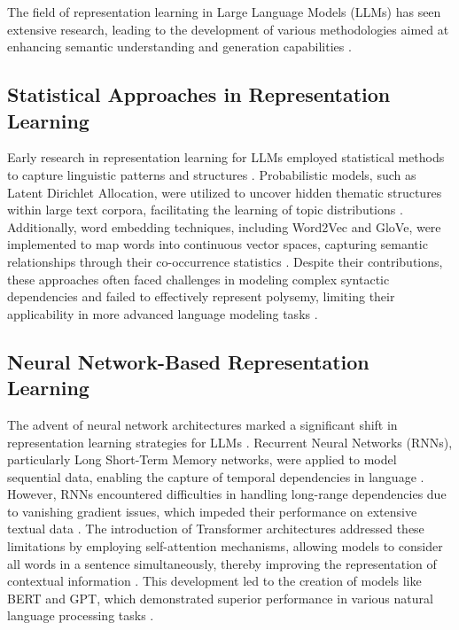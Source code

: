 \documentclass{article}
\begin{document}
The field of representation learning in Large Language Models (LLMs) has seen extensive research, leading to the development of various methodologies aimed at enhancing semantic understanding and generation capabilities \cite{wang2024optimizing,kanax2024contextualized}.

\subsection{Statistical Approaches in Representation Learning}

Early research in representation learning for LLMs employed statistical methods to capture linguistic patterns and structures \cite{amizern2024dynamic}. Probabilistic models, such as Latent Dirichlet Allocation, were utilized to uncover hidden thematic structures within large text corpora, facilitating the learning of topic distributions \cite{golatkar2024cpr}. Additionally, word embedding techniques, including Word2Vec and GloVe, were implemented to map words into continuous vector spaces, capturing semantic relationships through their co-occurrence statistics \cite{bargamon2024hierarchical,underwood2024implementing}. Despite their contributions, these approaches often faced challenges in modeling complex syntactic dependencies and failed to effectively represent polysemy, limiting their applicability in more advanced language modeling tasks \cite{cunningham2024efficient}.

\subsection{Neural Network-Based Representation Learning}

The advent of neural network architectures marked a significant shift in representation learning strategies for LLMs \cite{wong2024efficiency}. Recurrent Neural Networks (RNNs), particularly Long Short-Term Memory networks, were applied to model sequential data, enabling the capture of temporal dependencies in language \cite{fairburn2024mitigate,farmer2024optimizing}. However, RNNs encountered difficulties in handling long-range dependencies due to vanishing gradient issues, which impeded their performance on extensive textual data \cite{welling2024semantic}. The introduction of Transformer architectures addressed these limitations by employing self-attention mechanisms, allowing models to consider all words in a sentence simultaneously, thereby improving the representation of contextual information \cite{hubsch2024articulating, embury2024dynamic}. This development led to the creation of models like BERT and GPT, which demonstrated superior performance in various natural language processing tasks \cite{chen2024dynamic}.
\end{document}
